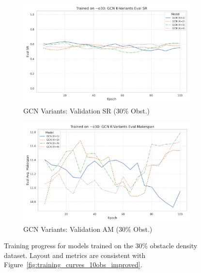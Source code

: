 \begin{figure}[htbp]
    \begin{subfigure}[b]{0.48\textwidth}
        \centering
        \includegraphics[width=\textwidth]{trainplotbase/TRAINED_ON_30_OBS/training_curves_focused/condition_o30/gcn_variants_eval_sr.png} %
        \caption{GCN Variants: Validation SR (30\% Obst.)}
        \label{fig:gcn_val_sr_30obs}
    \end{subfigure}
    \hfill
    \begin{subfigure}[b]{0.48\textwidth}
        \centering
        \includegraphics[width=\textwidth]{trainplotbase/TRAINED_ON_30_OBS/training_curves_focused/condition_o30/gcn_variants_eval_am.png} %
        \caption{GCN Variants: Validation AM (30\% Obst.)}
        \label{fig:gcn_val_am_30obs}
    \end{subfigure}

    \caption{Training progress for models trained on the 30\% obstacle density dataset. Layout and metrics are consistent with Figure~\ref{fig:training_curves_10obs_improved}.}
    \label{fig:training_curves_30obs_improved}
\end{figure}


